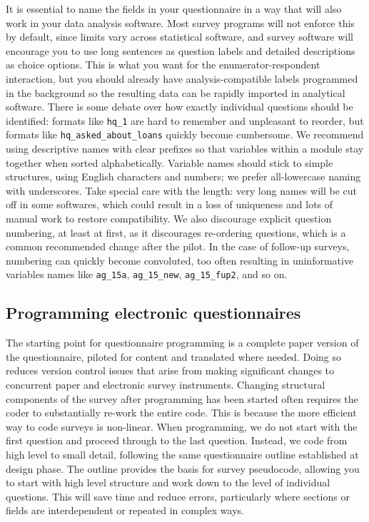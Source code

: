 It is essential to name the fields in your questionnaire
in a way that will also work in your data analysis software.
Most survey programs will not enforce this by default,
since limits vary across statistical software,
and survey software will encourage you
to use long sentences as question labels
and detailed descriptions as choice options.
This is what you want for the enumerator-respondent interaction,
but you should already have analysis-compatible labels programmed in the background
so the resulting data can be rapidly imported in analytical software.
There is some debate over how exactly individual questions should be identified:
formats like \texttt{hq\_1} are hard to remember and unpleasant to reorder,
but formats like \texttt{hq\_asked\_about\_loans} quickly become cumbersome.
We recommend using descriptive names with clear prefixes so that variables
within a module stay together when sorted alphabetically.
Variable names should stick to simple structures,
using English characters and numbers;
we prefer all-lowercase naming with underscores.
Take special care with the length:
very long names will be cut off in some softwares,
which could result in a loss of uniqueness
and lots of manual work to restore compatibility.
We also discourage explicit question numbering,
at least at first, as it discourages re-ordering questions,
which is a common recommended change after the pilot.
In the case of follow-up surveys, numbering can quickly become convoluted,
too often resulting in uninformative variables names like
\texttt{ag\_15a}, \texttt{ag\_15\_new}, \texttt{ag\_15\_fup2}, and so on.

\subsection{Programming electronic questionnaires}

The starting point for questionnaire programming
is a complete paper version of the questionnaire,
piloted for content and translated where needed.
Doing so reduces version control issues
that arise from making significant changes
to concurrent paper and electronic survey instruments.
Changing structural components of the survey
after programming has been started
often requires the coder to substantially re-work the entire code.
This is because the more efficient way to code surveys is non-linear.
When programming, we do not start with the first question and proceed through to the last question.
Instead, we code from high level to small detail,
following the same questionnaire outline established at design phase.
The outline provides the basis for survey pseudocode,
allowing you to start with high level structure and work down to the level of individual questions.
This will save time and reduce errors,
particularly where sections or fields
are interdependent or repeated in complex ways.

